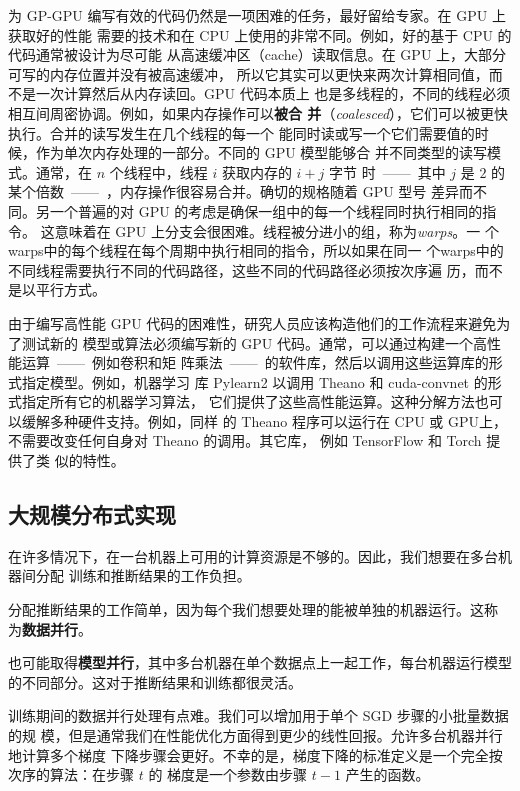 为 GP-GPU 编写有效的代码仍然是一项困难的任务，最好留给专家。在 GPU 上获取好的性能
需要的技术和在 CPU 上使用的非常不同。例如，好的基于 CPU 的代码通常被设计为尽可能
从高速缓冲区（cache）读取信息。在 GPU 上，大部分可写的内存位置并没有被高速缓冲，
所以它其实可以更快来两次计算相同值，而不是一次计算然后从内存读回。GPU 代码本质上
也是多线程的，不同的线程必须相互间周密协调。例如，如果内存操作可以\textbf{被合
  并}（\textit{coalesced}），它们可以被更快执行。合并的读写发生在几个线程的每一个
能同时读或写一个它们需要值的时候，作为单次内存处理的一部分。不同的 GPU 模型能够合
并不同类型的读写模式。通常，在 $n$ 个线程中，线程 $i$ 获取内存的 $i + j$ 字节
时~——~其中 $j$ 是 $2$ 的某个倍数~——~，内存操作很容易合并。确切的规格随着 GPU 型号
差异而不同。另一个普遍的对 GPU 的考虑是确保一组中的每一个线程同时执行相同的指令。
这意味着在 GPU 上分支会很困难。线程被分进小的组，称为\emph{\gls{warps}}。一
个\gls*{warps}中的每个线程在每个周期中执行相同的指令，所以如果在同一
个\gls*{warps}中的不同线程需要执行不同的代码路径，这些不同的代码路径必须按次序遍
历，而不是以平行方式。

由于编写高性能 GPU 代码的困难性，研究人员应该构造他们的工作流程来避免为了测试新的
模型或算法必须编写新的 GPU 代码。通常，可以通过构建一个高性能运算~——~例如卷积和矩
阵乘法~——~的软件库，然后以调用这些运算库的形式指定模型。例如，机器学习
库 Pylearn2 \citep{journals/corr/GoodfellowWLDMPBBB13} 以调用 Theano
\citep{bergstra-proc-scipy-2010,DBLP:journals/corr/abs-1211-5590} 和
cuda-convnet \citep{krizhevsky2010convolutional} 的形式指定所有它的机器学习算法，
它们提供了这些高性能运算。这种分解方法也可以缓解多种硬件支持。例如，同样
的 Theano 程序可以运行在 CPU 或 GPU上，不需要改变任何自身对 Theano 的调用。其它库，
例如 TensorFlow \citep{Abadi-et-al-2015} 和 Torch \citep{collobert2011torch7} 提供了类
似的特性。

\subsection{大规模分布式实现}
\label{subsec:large_scale_distributed_implementations}

在许多情况下，在一台机器上可用的计算资源是不够的。因此，我们想要在多台机器间分配
训练和推断结果的工作负担。

分配推断结果的工作简单，因为每个我们想要处理的能被单独的机器运行。这称
为\textbf{数据并行}。

也可能取得\textbf{模型并行}，其中多台机器在单个数据点上一起工作，每台机器运行模型
的不同部分。这对于推断结果和训练都很灵活。

训练期间的数据并行处理有点难。我们可以增加用于单个 \gls{SGD} 步骤的小批量数据的规
模，但是通常我们在性能优化方面得到更少的线性回报。允许多台机器并行地计算多个梯度
下降步骤会更好。不幸的是，梯度下降的标准定义是一个完全按次序的算法：在步骤 $t$ 的
梯度是一个参数由步骤 $t-1$ 产生的函数。

